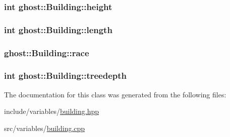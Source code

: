 \hypertarget{classghost_1_1Building_a2245674ef580e60ef2b3e908df930e41}{
\subsubsection[{height}]{\setlength{\rightskip}{0pt plus 5cm}int ghost\-::\-Building\-::height\hspace{0.3cm}{\ttfamily [private]}}}\label{classghost_1_1Building_a2245674ef580e60ef2b3e908df930e41}
\hypertarget{classghost_1_1Building_a19d6a2258d7d455607dd056f5ed7d390}{
\subsubsection[{length}]{\setlength{\rightskip}{0pt plus 5cm}int ghost\-::\-Building\-::length\hspace{0.3cm}{\ttfamily [private]}}}\label{classghost_1_1Building_a19d6a2258d7d455607dd056f5ed7d390}
\hypertarget{classghost_1_1Building_a8192def1fb4bdf85ee44cd99dd04f598}{
\subsubsection[{race}]{ ghost\-::\-Building\-::race\hspace{0.3cm}{\ttfamily [private]}}}\label{classghost_1_1Building_a8192def1fb4bdf85ee44cd99dd04f598}
\hypertarget{classghost_1_1Building_a9cce7581682e78208edde8ed462afe14}{
\subsubsection[{treedepth}]{\setlength{\rightskip}{0pt plus 5cm}int ghost\-::\-Building\-::treedepth\hspace{0.3cm}{\ttfamily [private]}}}\label{classghost_1_1Building_a9cce7581682e78208edde8ed462afe14}


The documentation for this class was generated from the following files\-:\begin{DoxyCompactItemize}
\item 
include/variables/\hyperlink{building_8hpp}{building.\-hpp}\item 
src/variables/\hyperlink{building_8cpp}{building.\-cpp}\end{DoxyCompactItemize}
